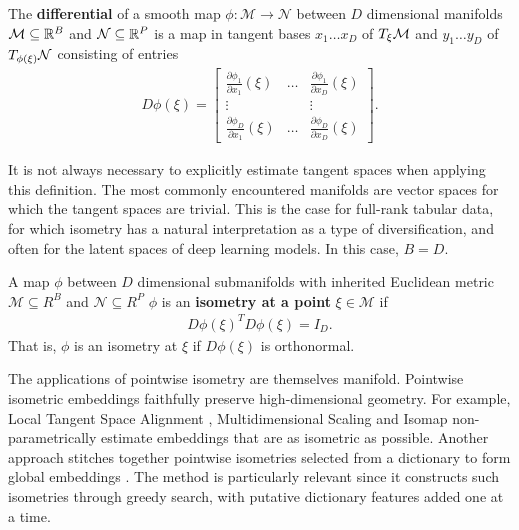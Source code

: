 \begin{definition}
The \textbf{differential} of a smooth map $\phi:\mathcal M \to \mathcal N$ between $D$ dimensional manifolds $\mathcal{M} \subseteq \mathbb R^B$ and $\mathcal{N} \subseteq \mathbb R^P$ is a map in tangent bases $x_1 \dots x_{D}$ of $T_\xi \mathcal{M}$ and $y_1 \dots y_{D}$ of $T_{\phi(\xi)} \mathcal{N}$ consisting of entries
\begin{align}
\label{eq:diff}
    D\phi (\xi) = \begin{bmatrix}
    \frac{\partial \phi_1  }{\partial x_1}(\xi)  & \dots & \frac{\partial \phi_1 }{\partial x_D}(\xi)  \\
    \vdots & & \vdots \\
    \frac{\partial \phi_D }{\partial x_1}(\xi)  & \dots & \frac{\partial \phi_{D}  }{\partial x_{D}}(\xi) 
    \end{bmatrix}.
\end{align}
\end{definition}

It is not always necessary to explicitly estimate tangent spaces when applying this definition.
The most commonly encountered manifolds are vector spaces for which the tangent spaces are trivial.
This is the case for full-rank tabular data, for which isometry has a natural interpretation as a type of diversification, and often for the latent spaces of deep learning models.
In this case, $B = D$.

\begin{definition}
\label{def:isometric_at_a_point}
A map $\phi$ between $D$ dimensional submanifolds with inherited Euclidean metric $\mathcal M \subseteq R^{B}$ and $\mathcal N  \subseteq R^{P}$
$\phi$ is an \textbf{isometry at a point} $\xi \in \mathcal M$ if
\begin{align}
{D \phi (\xi)}^T D \phi (\xi) = I_D.
\end{align}
That is, $\phi$ is an isometry at $\xi$ if $D \phi (\xi)$ is orthonormal.
\end{definition}

The applications of pointwise isometry are themselves manifold.
Pointwise isometric embeddings faithfully preserve high-dimensional geometry.
For example, Local Tangent Space Alignment \citep{ZhangZ:04}, Multidimensional Scaling \citep{ChenBuja:localMDS09} and Isomap \citep{tenenbaum2000ggf} non-parametrically estimate embeddings that are as isometric as possible.
Another approach stitches together pointwise isometries selected from a dictionary to form global embeddings \citep{Kohli2021-lr}.
The method is particularly relevant since it constructs such isometries through greedy search, with putative dictionary features added one at a time.

